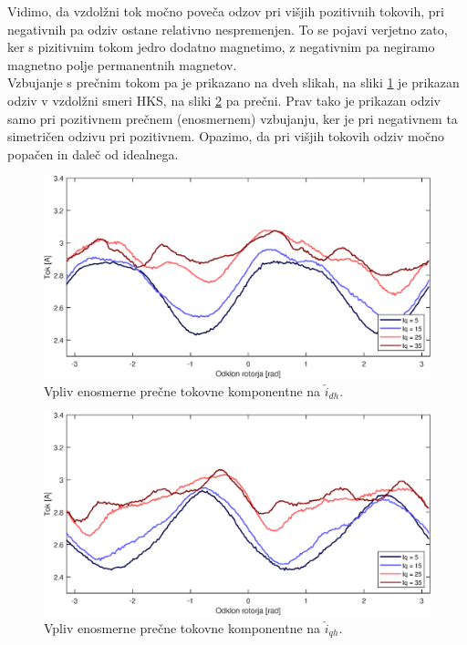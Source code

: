 \documentclass[a4paper,twoside,openright,12pt,slovene]{book}
\begin{document}
Vidimo, da vzdolžni tok močno poveča odzov pri višjih pozitivnih tokovih, pri negativnih pa odziv ostane relativno nespremenjen. To se pojavi verjetno zato, ker s pizitivnim tokom jedro dodatno
magnetimo, z negativnim pa negiramo magnetno polje permanentnih magnetov.
\\
Vzbujanje s prečnim tokom pa je prikazano na dveh slikah, na sliki \ref{tokovniOdzivIq_IdAmp} je prikazan odziv v vzdolžni smeri HKS, na sliki \ref{tokovniOdzivIq_IqAmp} pa prečni. Prav tako je
prikazan odziv samo pri pozitivnem prečnem (enosmernem) vzbujanju, ker je pri negativnem ta simetričen odzivu pri pozitivnem. Opazimo, da pri višjih tokovih odziv močno popačen in daleč od idealnega.

\begin{figure}[!htbp]
    \centering
    \includegraphics[width=0.95\columnwidth]{Slike/tokovniOdzivIq_IdAmp.eps}
    \caption{\label{tokovniOdzivIq_IdAmp} Vpliv enosmerne prečne tokovne komponentne na $\hat{i}_{dh}$.}
\end{figure}

\begin{figure}[!htbp]
    \centering
    \includegraphics[width=0.95\columnwidth]{Slike/tokovniOdzivIq_IqAmp.eps}
    \caption{\label{tokovniOdzivIq_IqAmp} Vpliv enosmerne prečne tokovne komponentne na $\hat{i}_{qh}$.}
\end{figure}
 
\end{document}
